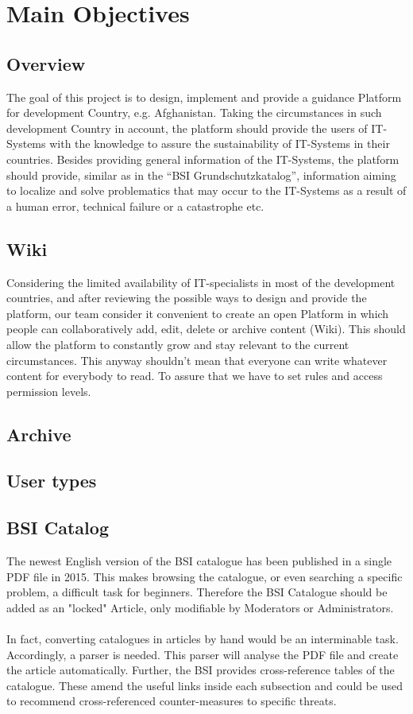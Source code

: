 \chapter{Main Objectives}
\section{Overview}
The goal of this project is to design, implement and provide a guidance Platform for development Country, e.g. Afghanistan. Taking the circumstances in such development Country in account, the platform should provide the users of IT-Systems with the knowledge to assure the sustainability of IT-Systems in their countries. Besides providing general information of the IT-Systems, the platform should provide, similar as in the “BSI Grundschutzkatalog”, information aiming to localize and solve problematics that may occur to the IT-Systems as a result of a human error, technical failure or a catastrophe etc. 

\section{Wiki}
Considering the limited availability of IT-specialists in most of the development countries, and after reviewing the possible ways to design and provide the platform, our team consider it convenient to create an open Platform in which people can collaboratively add, edit, delete or archive content (Wiki). This should allow the platform to constantly grow and stay relevant to the current circumstances. This anyway shouldn’t mean that everyone can write whatever content for everybody to read. To assure that we have to set rules and access permission levels. 

\section{Archive}
\section{User types}
\section{BSI Catalog}

The newest English version of the BSI catalogue has been published in a single PDF file in 2015. This makes browsing the catalogue, or even searching a specific problem, a difficult task for beginners. Therefore the BSI Catalogue should be added as an "locked" Article, only modifiable by Moderators or Administrators.
\\\\
In fact, converting catalogues in articles by hand would be an interminable task. Accordingly, a parser is needed. This parser will analyse the PDF file and create the article automatically. Further, the BSI provides cross-reference tables of the catalogue. These amend the useful links inside each subsection and could be used to recommend cross-referenced counter-measures to specific threats.

